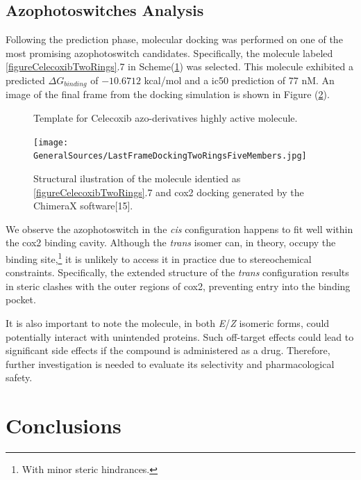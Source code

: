 \documentclass[11pt]{article}
\begin{document}
\subsection{Azophotoswitches Analysis}

Following the prediction phase, molecular docking was performed on one of the most promising azophotoswitch candidates. Specifically, the molecule labeled \ref{figureCelecoxibTwoRings}.7 in Scheme(\ref{figureCelecoxibTwoRingsDoking}) was selected. This molecule exhibited a predicted $\Delta G_{binding}$ of $-10.6712$ kcal/mol and a \gls{ic50} prediction of 77 nM. An image of the final frame from the docking simulation is shown in Figure (\ref{figureDockingBestResult}).

\begin{figure}[H]
\captionsetup{type=scheme}
\centering
{}
\caption{Template for Celecoxib azo-derivatives highly active molecule.}
\label{figureCelecoxibTwoRingsDoking}
\end{figure}

\begin{figure}[H]
	\centering
	\texttt{[image: GeneralSources/LastFrameDockingTwoRingsFiveMembers.jpg]}
	\caption{Structural ilustration of the molecule identied as \ref{figureCelecoxibTwoRings}.7 and \gls{cox2} docking generated by the ChimeraX software[15].}
	\label{figureDockingBestResult}
\end{figure}
We observe the azophotoswitch in the \emph{cis} configuration happens to fit well within the \gls{cox2} binding cavity. Although the \emph{trans} isomer can, in theory, occupy the binding site,\footnote{With minor steric hindrances.} it is unlikely to access it in practice due to stereochemical constraints. Specifically, the extended structure of the \emph{trans} configuration results in steric clashes with the outer regions of \gls{cox2}, preventing entry into the binding pocket.

It is also important to note the molecule, in both \emph{E}/\emph{Z} isomeric forms, could potentially interact with unintended proteins. Such off-target effects could lead to significant side effects if the compound is administered as a drug. Therefore, further investigation is needed to evaluate its selectivity and pharmacological safety.

\newpage
\section{Conclusions}
\end{document}
